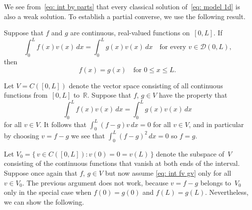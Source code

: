We see from~\eqref{eq: int by parts} that every classical solution 
of~\eqref{eq: model 1d} is also a weak solution.  To establish a partial 
converse, we use the following result.

\begin{lemma}
Suppose that $f$ and $g$ are continuous, real-valued functions on~$[0,L]$.
If
\[
\int_0^L f(x)v(x)\,dx=\int_0^L g(x)v(x)\,dx
	\quad\text{for every $v\in\mathcal{D}(0,L)$,}
\]
then 
\[
f(x)=g(x)\quad\text{for $0\le x\le L$.}
\]
\end{lemma}

Let $V=C([0,L])$ denote the vector space consisting of all continuous functions 
from~$[0,L]$ to~$\mathbb{R}$.  Suppose that $f$, $g\in V$ have the property that
\begin{equation}\label{eq: int fv gv}
\int_0^Lf(x)v(x)\,dx=\int_0^Lg(x)v(x)\,dx
\end{equation}
for all $v\in V$. It follows that $\int_0^L(f-g)v\,dx=0$ for all $v\in V$, and 
in particular by choosing $v=f-g$ we see that $\int_0^L(f-g)^2\,dx=0$ so $f=g$.

Let $V_0=\{\,v\in C([0,L]):v(0)=0=v(L)\,\}$ denote the subspace of~$V$ 
consisting of the continuous functions that vanish at both ends of the interval.
Suppose once again that $f$, $g\in V$ but now assume \eqref{eq: int fv gv} 
only for all $v\in V_0$.  The previous argument does not work, because $v=f-g$ 
belongs to~$V_0$ only in the special case when $f(0)=g(0)$ and $f(L)=g(L)$.  
Nevertheless, we can show the following.

